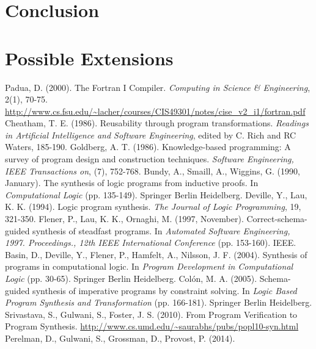 \documentclass[a4paper,twoside,notitlepage]{report}
\begin{document}
\section{Conclusion}
\section{Possible Extensions}

\begin{thebibliography}{9}
        Padua, D. (2000). The Fortran I Compiler.
        \emph{Computing in Science \& Engineering}, 2(1), 70-75.
        \url{http://www.cs.fsu.edu/~lacher/courses/CIS49301/notes/cise_v2_i1/fortran.pdf}
        Cheatham, T. E. (1986). Reusability through program transformations. 
        \emph{Readings in Artificial Intelligence and Software Engineering}, 
        edited by C. Rich and RC Waters, 185-190.
        Goldberg, A. T. (1986). Knowledge-based programming:
        A survey of program design and construction techniques.
        \emph{Software Engineering, IEEE Transactions on}, (7), 752-768.
        Bundy, A., Smaill, A., Wiggins, G. (1990, January).
        The synthesis of logic programs from inductive proofs.
        In \emph{Computational Logic} (pp. 135-149). Springer Berlin Heidelberg.
        Deville, Y., Lau, K. K. (1994). Logic program synthesis.
        \emph{The Journal of Logic Programming}, 19, 321-350.
        Flener, P., Lau, K. K., Ornaghi, M. (1997, November). 
        Correct-schema-guided synthesis of steadfast programs.
        In \emph{Automated Software Engineering, 1997.
        Proceedings., 12th IEEE International Conference} (pp. 153-160). IEEE.
        Basin, D., Deville, Y., Flener, P., Hamfelt, A., Nilsson, J. F. (2004).
        Synthesis of programs in computational logic.
        In \emph{Program Development in Computational Logic} (pp. 30-65).
        Springer Berlin Heidelberg.
        Colón, M. A. (2005). Schema-guided synthesis of imperative programs by 
        constraint solving. In \emph{Logic Based Program Synthesis and 
        Transformation} (pp. 166-181). Springer Berlin Heidelberg.
        Srivastava, S., Gulwani, S., Foster, J. S. (2010).
        From Program Verification to Program Synthesis.
        \url{http://www.cs.umd.edu/~saurabhs/pubs/popl10-syn.html}
        Perelman, D., Gulwani, S., Grossman, D., Provost, P. (2014).

\end{thebibliography}
\end{document}
